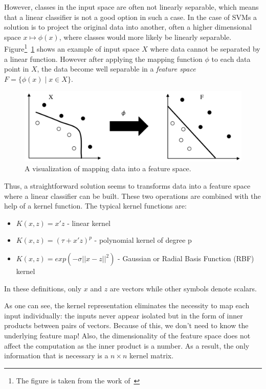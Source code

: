 However, classes in the input space are often not linearly separable, which means that a linear classifier is not a good option in such a case. In the case of SVMs a solution is to project the original data into another, often a higher dimensional space \(x \mapsto \phi(x) \), where classes would more likely be linearly separable. Figure\footnote{The figure is taken from the work of~\cite{Okun;Valentini:2009}}~\ref{fig:hyperplane2} shows an example of input space \(X\) where data cannot be separated by a linear function. However after applying the mapping function \(\phi\) to each data point in \(X\), the data become well separable in a \textit{feature space} \(F = \{ \phi(x)\; | \; x \in X\}\).
\begin{figure}[h!]
    \centering
    \includegraphics[scale=0.6]{Graphics/svp-separation.png}
    \caption{A visualization of mapping data into a feature space.}
    \label{fig:hyperplane2}
\end{figure}

Thus, a straightforward solution seems to transforms data into a feature space where a linear classifier can be built. These two operations are combined with the help of a kernel function. The typical kernel functions are:
\begin{itemize}
            \item \(K(x,z) = x'z \) - linear kernel
            \item \(K(x,z) = (\tau + x'z)^p\) - polynomial kernel of degree p
            \item \(K(x,z) = exp(-\sigma||x-z||^2)\) - Gaussian or Radial Basis Function (RBF) kernel
\end{itemize}

In these definitions, only $x$ and $z$ are vectors while other symbols denote scalars.

As one can see, the kernel representation eliminates the necessity to map each input individually: the inputs never appear isolated but in the form of inner products between pairs of vectors. Because of this, we don't need to know the underlying feature map! Also, the dimensionality of the feature space does not affect the computation as the inner product is a number. As a result, the only information that is necessary is a \(n\times n\) kernel matrix.

